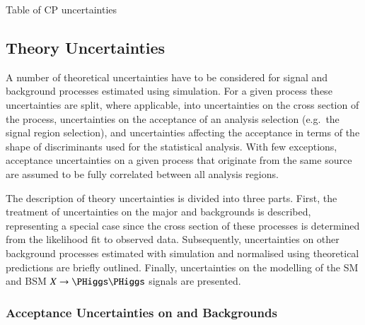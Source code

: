 \begin{table}[htbp]
  \centering

  \caption{Table of CP uncertainties}%
  \label{tab:experimental_uncertainties}

  
\end{table}




\subsection{Theory Uncertainties}%
\label{sec:modelling_uncertainties}%
\label{sec:theory_uncertainties}

A number of theoretical uncertainties have to be considered for signal
and background processes estimated using simulation. For a given
process these uncertainties are split, where applicable, into
uncertainties on the cross section of the process, uncertainties on
the acceptance of an analysis selection (e.g.\ the signal region
selection), and uncertainties affecting the acceptance in terms of the
shape of discriminants used for the statistical analysis. With few
exceptions, acceptance uncertainties on a given process that originate
from the same source are assumed to be fully correlated between all
analysis regions.

The description of theory uncertainties is divided into three parts.
First, the treatment of uncertainties on the major \ZHF and \ttbar
backgrounds is described, representing a special case since the cross
section of these processes is determined from the likelihood fit to
observed data. Subsequently, uncertainties on other background
processes estimated with simulation and normalised using theoretical
predictions are briefly outlined. Finally, uncertainties on the
modelling of the SM \HH and BSM $X \to \HH$ signals are presented.

\subsubsection{Acceptance Uncertainties on \ZHF and \ttbar Backgrounds}

